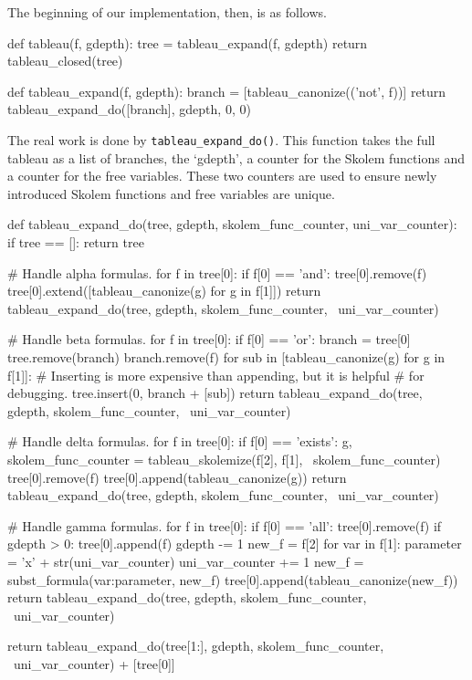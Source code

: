\documentclass[a4paper,notitlepage]{scrartcl}
\begin{document}
The beginning of our implementation, then, is as follows.

\begin{code}
def tableau(f, gdepth):
    tree = tableau_expand(f, gdepth)
    return tableau_closed(tree)

def tableau_expand(f, gdepth):
    branch = [tableau_canonize(('not', f))]
    return tableau_expand_do([branch], gdepth, 0, 0)
\end{code}

The real work is done by \texttt{tableau\_expand\_do()}. This function takes
the full tableau as a list of branches, the `gdepth', a counter for the Skolem
functions and a counter for the free variables. These two counters are used to
ensure newly introduced Skolem functions and free variables are unique.

\begin{code}
def tableau_expand_do(tree, gdepth, skolem_func_counter, uni_var_counter):
    if tree == []:
        return tree

    # Handle alpha formulas.
    for f in tree[0]:
        if f[0] == 'and':
            tree[0].remove(f)
            tree[0].extend([tableau_canonize(g) for g in f[1]])
            return tableau_expand_do(tree, gdepth, skolem_func_counter, \
		uni_var_counter)

    # Handle beta formulas.
    for f in tree[0]:
        if f[0] == 'or':
            branch = tree[0]
            tree.remove(branch)
            branch.remove(f)
            for sub in [tableau_canonize(g) for g in f[1]]:
                # Inserting is more expensive than appending, but it is helpful
                # for debugging.
                tree.insert(0, branch + [sub])
            return tableau_expand_do(tree, gdepth, skolem_func_counter, \
		uni_var_counter)

    # Handle delta formulas.
    for f in tree[0]:
        if f[0] == 'exists':
            g, skolem_func_counter = tableau_skolemize(f[2], f[1], \
		skolem_func_counter)
            tree[0].remove(f)
            tree[0].append(tableau_canonize(g))
            return tableau_expand_do(tree, gdepth, skolem_func_counter, \
		uni_var_counter)

    # Handle gamma formulas.
    for f in tree[0]:
        if f[0] == 'all':
            tree[0].remove(f)
            if gdepth > 0:
                tree[0].append(f)
                gdepth -= 1
            new_f = f[2]
            for var in f[1]:
                parameter = 'x' + str(uni_var_counter)
                uni_var_counter += 1
                new_f = subst_formula({var:parameter}, new_f)
            tree[0].append(tableau_canonize(new_f))
            return tableau_expand_do(tree, gdepth, skolem_func_counter, \
		uni_var_counter)

    return tableau_expand_do(tree[1:], gdepth, skolem_func_counter, \
	uni_var_counter) + [tree[0]]
\end{code}
\end{document}
